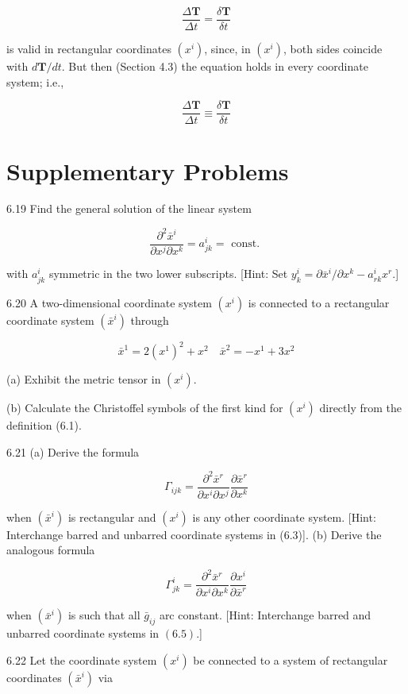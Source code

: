 \documentclass[10pt]{article}
\begin{document}
$$
\frac{\Delta \mathbf{T}}{\Delta t}=\frac{\delta \mathbf{T}}{\delta t}
$$

is valid in rectangular coordinates $\left(x^{i}\right)$, since, in $\left(x^{i}\right)$, both sides coincide with $d \mathbf{T} / d t$. But then (Section 4.3) the equation holds in every coordinate system; i.e.,

$$
\frac{\Delta \mathbf{T}}{\Delta t} \equiv \frac{\delta \mathbf{T}}{\delta t}
$$

\section*{Supplementary Problems}
6.19 Find the general solution of the linear system

$$
\frac{\partial^{2} \bar{x}^{i}}{\partial x^{j} \partial x^{k}}=a_{j k}^{i}=\text { const. }
$$

with $a_{j k}^{i}$ symmetric in the two lower subscripts. [Hint: Set $y_{k}^{i}=\partial \bar{x}^{i} / \partial x^{k}-a_{r k}^{i} x^{r}$.]

6.20 A two-dimensional coordinate system $\left(x^{i}\right)$ is connected to a rectangular coordinate system $\left(\bar{x}^{i}\right)$ through

$$
\bar{x}^{1}=2\left(x^{1}\right)^{2}+x^{2} \quad \bar{x}^{2}=-x^{1}+3 x^{2}
$$

(a) Exhibit the metric tensor in $\left(x^{i}\right)$.

(b) Calculate the Christoffel symbols of the first kind for $\left(x^{i}\right)$ directly from the definition (6.1).

6.21 (a) Derive the formula

$$
\Gamma_{i j k}=\frac{\partial^{2} \bar{x}^{r}}{\partial x^{i} \partial x^{j}} \frac{\partial \bar{x}^{r}}{\partial x^{k}}
$$

when $\left(\bar{x}^{i}\right)$ is rectangular and $\left(x^{i}\right)$ is any other coordinate system. [Hint: Interchange barred and unbarred coordinate systems in (6.3)]. (b) Derive the analogous formula

$$
\Gamma_{j k}^{i}=\frac{\partial^{2} \bar{x}^{r}}{\partial x^{i} \partial x^{k}} \frac{\partial x^{i}}{\partial \bar{x}^{r}}
$$

when $\left(\bar{x}^{i}\right)$ is such that all $\bar{g}_{i j}$ arc constant. [Hint: Interchange barred and unbarred coordinate systems in $(6.5)$.]

6.22 Let the coordinate system $\left(x^{i}\right)$ be connected to a system of rectangular coordinates $\left(\bar{x}^{i}\right)$ via
\end{document}

